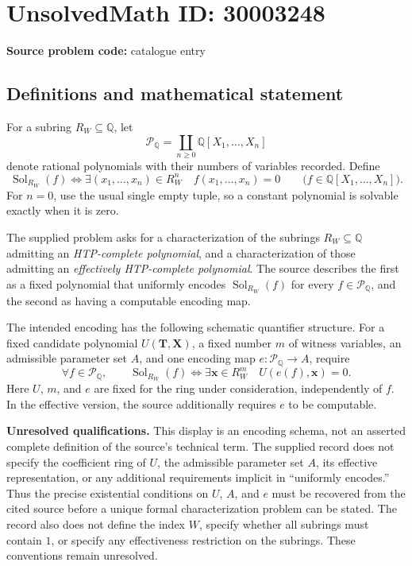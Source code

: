 \documentclass[11pt]{article}
\newcommand{\Q}{\mathbb{Q}}
\begin{document}
\section*{UnsolvedMath ID: 30003248}
\textbf{Source problem code:} catalogue entry
\subsection{Definitions and mathematical statement}
For a subring \(R_W\subseteq\Q\), let
\[
\mathcal P_{\Q}=\coprod_{n\geq 0}\Q[X_1,\ldots,X_n]
\]
denote rational polynomials with their numbers of variables recorded. Define
\[
\operatorname{Sol}_{R_W}(f)\iff
\exists(x_1,\ldots,x_n)\in R_W^n\quad f(x_1,\ldots,x_n)=0
\qquad\bigl(f\in\Q[X_1,\ldots,X_n]\bigr).
\]
For \(n=0\), use the usual single empty tuple, so a constant polynomial is solvable exactly when it is zero.

The supplied problem asks for a characterization of the subrings \(R_W\subseteq\Q\) admitting an \emph{HTP-complete polynomial}, and a characterization of those admitting an \emph{effectively HTP-complete polynomial}. The source describes the first as a fixed polynomial that uniformly encodes \(\operatorname{Sol}_{R_W}(f)\) for every \(f\in\mathcal P_{\Q}\), and the second as having a computable encoding map.

The intended encoding has the following schematic quantifier structure. For a fixed candidate polynomial \(U(\mathbf T,\mathbf X)\), a fixed number \(m\) of witness variables, an admissible parameter set \(A\), and one encoding map \(e:\mathcal P_{\Q}\to A\), require
\[
\forall f\in\mathcal P_{\Q},\qquad
\operatorname{Sol}_{R_W}(f)
\iff
\exists\mathbf x\in R_W^m\quad U(e(f),\mathbf x)=0.
\]
Here \(U\), \(m\), and \(e\) are fixed for the ring under consideration, independently of \(f\). In the effective version, the source additionally requires \(e\) to be computable.

\textbf{Unresolved qualifications.} This display is an encoding schema, not an asserted complete definition of the source's technical term. The supplied record does not specify the coefficient ring of \(U\), the admissible parameter set \(A\), its effective representation, or any additional requirements implicit in ``uniformly encodes.'' Thus the precise existential conditions on \(U\), \(A\), and \(e\) must be recovered from the cited source before a unique formal characterization problem can be stated. The record also does not define the index \(W\), specify whether all subrings must contain \(1\), or specify any effectiveness restriction on the subrings. These conventions remain unresolved.
\end{document}
